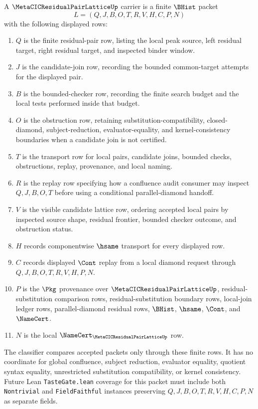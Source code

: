 \begin{definition}
\label{def:metacic-residual-pair-lattice-carrier}
A $\MetaCICResidualPairLatticeUp$ carrier is a finite $\BHist$ packet
$$
L=(Q,J,B,O,T,R,V,H,C,P,N)
$$
with the following displayed rows:
\begin{enumerate}
\item $Q$ is the finite residual-pair row, listing the local peak source, left residual target, right residual target, and inspected binder window.
\item $J$ is the candidate-join row, recording the bounded common-target attempts for the displayed pair.
\item $B$ is the bounded-checker row, recording the finite search budget and the local tests performed inside that budget.
\item $O$ is the obstruction row, retaining substitution-compatibility, closed-diamond, subject-reduction, evaluator-equality, and kernel-consistency boundaries when a candidate join is not certified.
\item $T$ is the transport row for local pairs, candidate joins, bounded checks, obstructions, replay, provenance, and local naming.
\item $R$ is the replay row specifying how a confluence audit consumer may inspect $Q,J,B,O,T$ before using a conditional parallel-diamond handoff.
\item $V$ is the visible candidate lattice row, ordering accepted local pairs by inspected source shape, residual frontier, bounded checker outcome, and obstruction status.
\item $H$ records componentwise $\hsame$ transport for every displayed row.
\item $C$ records displayed $\Cont$ replay from a local diamond request through $Q,J,B,O,T,R,V,H,P,N$.
\item $P$ is the $\Pkg$ provenance over $\MetaCICResidualPairLatticeUp$, residual-substitution comparison rows, residual-substitution boundary rows, local-join ledger rows, parallel-diamond residual rows, $\BHist$, $\hsame$, $\Cont$, and $\NameCert$.
\item $N$ is the local $\NameCert_{\MetaCICResidualPairLatticeUp}$ row.
\end{enumerate}
The classifier compares accepted packets only through these finite rows. It has no coordinate for global confluence, subject reduction, evaluator equality, quotient syntax equality, unrestricted substitution compatibility, or kernel consistency. Future Lean \texttt{TasteGate.lean} coverage for this packet must include both \texttt{Nontrivial} and \texttt{FieldFaithful} instances preserving $Q,J,B,O,T,R,V,H,C,P,N$ as separate fields.
\end{definition}


